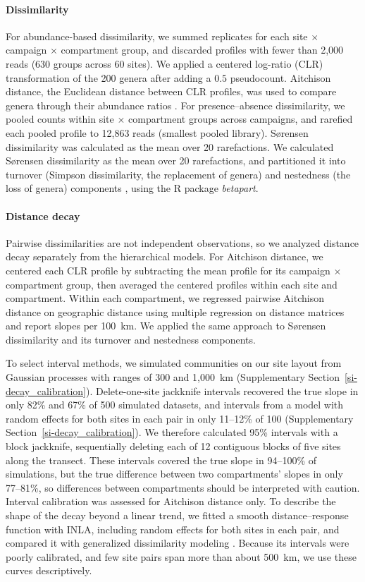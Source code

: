 \documentclass[fleqn,10pt,numbers]{olplainarticle}
\begin{document}
\paragraph{Dissimilarity}
For abundance-based dissimilarity, we summed replicates for each site $\times$ campaign $\times$ compartment group, and discarded profiles with fewer than 2,000 reads (630 groups across 60 sites). We applied a centered log-ratio (CLR) transformation of the 200 genera after adding a $0.5$ pseudocount. Aitchison distance, the Euclidean distance between CLR profiles, was used to compare genera through their abundance ratios \cite{tellmewhy}. For presence--absence dissimilarity, we pooled counts within site $\times$ compartment groups across campaigns, and rarefied each pooled profile to 12,863 reads (smallest pooled library). Sørensen dissimilarity was calculated as the mean over 20 rarefactions. We calculated Sørensen dissimilarity as the mean over 20 rarefactions, and partitioned it into turnover (Simpson dissimilarity, the replacement of genera) and nestedness (the loss of genera) components \cite{baselga2010partition}, using the R package \textit{betapart}.

\paragraph{Distance decay}
Pairwise dissimilarities are not independent observations, so we analyzed distance decay separately from the hierarchical models. For Aitchison distance, we centered each CLR profile by subtracting the mean profile for its campaign $\times$ compartment group, then averaged the centered profiles within each site and compartment. Within each compartment, we regressed pairwise Aitchison distance on geographic distance using multiple regression on distance matrices and report slopes per 100~km. We applied the same approach to Sørensen dissimilarity and its turnover and nestedness components.

To select interval methods, we simulated communities on our site layout from Gaussian processes with ranges of 300 and 1,000~km (Supplementary Section~\ref{si-decay_calibration}). Delete-one-site jackknife intervals recovered the true slope in only 82\% and 67\% of 500 simulated datasets, and intervals from a model with random effects for both sites in each pair in only 11–12\% of 100 (Supplementary Section~\ref{si-decay_calibration}). We therefore calculated 95\% intervals with a block jackknife, sequentially deleting each of 12 contiguous blocks of five sites along the transect. These intervals covered the true slope in 94--100\% of simulations, but the true difference between two compartments' slopes in only 77--81\%, so differences between compartments should be interpreted with caution. Interval calibration was assessed for Aitchison distance only. To describe the shape of the decay beyond a linear trend, we fitted a smooth distance--response function with INLA, including random effects for both sites in each pair, and compared it with generalized dissimilarity modeling \cite{ferrier2007}. Because its intervals were poorly calibrated, and few site pairs span more than about 500~km, we use these curves descriptively.
\end{document}
